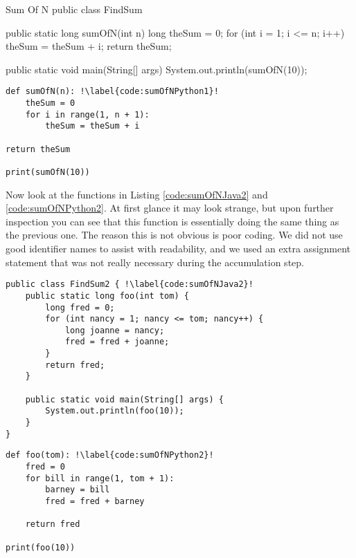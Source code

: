 
\begin{javacode}[label={code:sumOfNJava1}]{Sum Of N}
public class FindSum {
	public static long sumOfN(int n) {
		long theSum = 0;
		for (int i = 1; i <= n; i++) {
			theSum = theSum + i;
		}
		return theSum;
	}
	
	public static void main(String[] args) {
		System.out.println(sumOfN(10));
	}
}
\end{javacode}



\begin{verbatim}
def sumOfN(n): !\label{code:sumOfNPython1}!
	theSum = 0
	for i in range(1, n + 1):
		theSum = theSum + i

return theSum

print(sumOfN(10))
\end{verbatim}

Now look at the functions in Listing \ref{code:sumOfNJava2} and \ref{code:sumOfNPython2}. At first glance it may look strange, but upon further inspection you can see that this function is essentially doing the same thing as the previous one. The reason this is not obvious is poor coding. We did not use good identifier names to assist with readability, and we used an extra assignment statement that was not really necessary during the accumulation step.

\begin{verbatim}
public class FindSum2 { !\label{code:sumOfNJava2}!
	public static long foo(int tom) {
		long fred = 0;
		for (int nancy = 1; nancy <= tom; nancy++) {
			long joanne = nancy;
			fred = fred + joanne;
		}
		return fred;
	}
	
	public static void main(String[] args) {
		System.out.println(foo(10));
	}
}
\end{verbatim}

\begin{verbatim}
def foo(tom): !\label{code:sumOfNPython2}!
	fred = 0
	for bill in range(1, tom + 1):
		barney = bill
		fred = fred + barney
	
	return fred

print(foo(10))
\end{verbatim}

